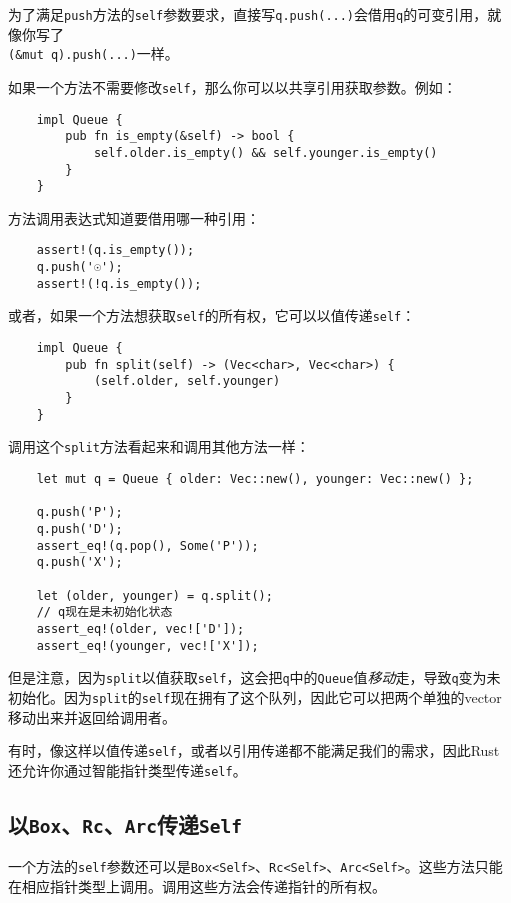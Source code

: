 为了满足\texttt{push}方法的\texttt{self}参数要求，直接写\texttt{q.push(...)}会借用\texttt{q}的可变引用，就像你写了\\
\texttt{(\&mut q).push(...)}一样。

如果一个方法不需要修改\texttt{self}，那么你可以以共享引用获取参数。例如：
\begin{verbatim}
    impl Queue {
        pub fn is_empty(&self) -> bool {
            self.older.is_empty() && self.younger.is_empty()
        }
    }
\end{verbatim}

方法调用表达式知道要借用哪一种引用：
\begin{verbatim}
    assert!(q.is_empty());
    q.push('☉');
    assert!(!q.is_empty());
\end{verbatim}

或者，如果一个方法想获取\texttt{self}的所有权，它可以以值传递\texttt{self}：
\begin{verbatim}
    impl Queue {
        pub fn split(self) -> (Vec<char>, Vec<char>) {
            (self.older, self.younger)
        }
    }
\end{verbatim}

调用这个\texttt{split}方法看起来和调用其他方法一样：
\begin{verbatim}
    let mut q = Queue { older: Vec::new(), younger: Vec::new() };

    q.push('P');
    q.push('D');
    assert_eq!(q.pop(), Some('P'));
    q.push('X');

    let (older, younger) = q.split();
    // q现在是未初始化状态
    assert_eq!(older, vec!['D']);
    assert_eq!(younger, vec!['X']);
\end{verbatim}

但是注意，因为\texttt{split}以值获取\texttt{self}，这会把\texttt{q}中的\texttt{Queue}值\emph{移动}走，导致\texttt{q}变为未初始化。因为\texttt{split}的\texttt{self}现在拥有了这个队列，因此它可以把两个单独的vector移动出来并返回给调用者。

有时，像这样以值传递\texttt{self}，或者以引用传递都不能满足我们的需求，因此Rust还允许你通过智能指针类型传递\texttt{self}。

\subsection{以\texttt{Box}、\texttt{Rc}、\texttt{Arc}传递\texttt{Self}}

一个方法的\texttt{self}参数还可以是\texttt{Box<Self>}、\texttt{Rc<Self>}、\texttt{Arc<Self>}。这些方法只能在相应指针类型上调用。调用这些方法会传递指针的所有权。

